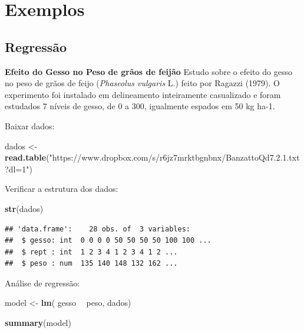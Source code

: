 \documentclass[
]{book}
\newenvironment{Shaded}{\begin{snugshade}}{\end{snugshade}}
\newcommand{\KeywordTok}[1]{\textcolor[rgb]{0.13,0.29,0.53}{\textbf{#1}}}
\newcommand{\NormalTok}[1]{#1}
\newcommand{\OperatorTok}[1]{\textcolor[rgb]{0.81,0.36,0.00}{\textbf{#1}}}
\newcommand{\StringTok}[1]{\textcolor[rgb]{0.31,0.60,0.02}{#1}}
\begin{document}
\hypertarget{exemplos}{%
\section{Exemplos}\label{exemplos}}

\hypertarget{regressuxe3o}{%
\subsection{Regressão}\label{regressuxe3o}}

\textbf{Efeito do Gesso no Peso de grãos de feijão}
Estudo sobre o efeito do gesso no peso de grãos de feijo (\emph{Phaseolus vulgaris} L.) feito por Ragazzi (1979). O experimento foi instalado em delineamento inteiramente casualizado e foram estudados 7 níveis de gesso, de 0 a 300, igualmente espados em 50 kg ha-1.

Baixar dados:

\begin{Shaded}
\begin{Highlighting}[]
\NormalTok{dados <-}\StringTok{ }\KeywordTok{read.table}\NormalTok{(}\StringTok{"https://www.dropbox.com/s/r6jz7mrktbgnbnx/BanzattoQd7.2.1.txt?dl=1"}\NormalTok{)}
\end{Highlighting}
\end{Shaded}

Verificar a estrutura dos dados:

\begin{Shaded}
\begin{Highlighting}[]
\KeywordTok{str}\NormalTok{(dados)}
\end{Highlighting}
\end{Shaded}

\begin{verbatim}
## 'data.frame':    28 obs. of  3 variables:
##  $ gesso: int  0 0 0 0 50 50 50 50 100 100 ...
##  $ rept : int  1 2 3 4 1 2 3 4 1 2 ...
##  $ peso : num  135 140 148 132 162 ...
\end{verbatim}

Análise de regressão:

\begin{Shaded}
\begin{Highlighting}[]
\NormalTok{model <-}\StringTok{ }\KeywordTok{lm}\NormalTok{(  gesso }\OperatorTok{~}\StringTok{ }\NormalTok{peso, dados)}

\KeywordTok{summary}\NormalTok{(model)}
\end{Highlighting}
\end{Shaded}
\end{document}
